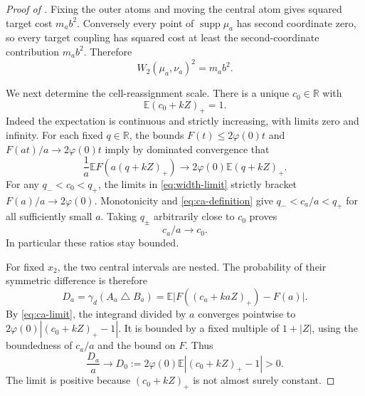 \documentclass[11pt]{article}
\numberwithin{equation}{section}
\theoremstyle{remark}
\newcommand{\R}{\mathbb R}
\newcommand{\E}{\mathbb E}
\newcommand{\supp}{\operatorname{supp}}
\begin{document}
\begin{proof}[Proof of ]
Fixing the outer atoms and moving the central atom gives squared target cost $m_ab^2$. Conversely every point of $\supp\mu_a$ has second coordinate zero, so every target coupling has squared cost at least the second-coordinate contribution $m_ab^2$. Therefore
\begin{equation}\label{eq:gaussian-w2}
 W_2(\mu_a,\nu_a)^2=m_ab^2.
\end{equation}

We next determine the cell-reassignment scale. There is a unique $c_0\in\R$ with
\begin{equation}\label{eq:c0}
 \E(c_0+kZ)_+=1.
\end{equation}
Indeed the expectation is continuous and strictly increasing, with limits zero and infinity. For each fixed $q\in\R$, the bounds
$F(t)\le2\varphi(0)t$ and $F(at)/a\to2\varphi(0)t$ imply by dominated convergence that
\begin{equation}\label{eq:width-limit}
 \frac1a\E F(a(q+kZ)_+)
 \longrightarrow 2\varphi(0)\E(q+kZ)_+.
\end{equation}
For any $q_-<c_0<q_+$, the limits in \eqref{eq:width-limit} strictly bracket $F(a)/a\to2\varphi(0)$. Monotonicity and \eqref{eq:ca-definition} give $q_-<c_a/a<q_+$ for all sufficiently small $a$. Taking $q_\pm$ arbitrarily close to $c_0$ proves
\begin{equation}\label{eq:ca-limit}
 c_a/a\longrightarrow c_0.
\end{equation}
In particular these ratios stay bounded.

For fixed $x_2$, the two central intervals are nested. The probability of their symmetric difference is therefore
\[
 D_a=\gamma_d(A_a\mathbin\triangle B_a)
 =\E\bigl|F((c_a+kaZ)_+)-F(a)\bigr|.
\]
By \eqref{eq:ca-limit}, the integrand divided by $a$ converges pointwise to $2\varphi(0)|(c_0+kZ)_+-1|$. It is bounded by a fixed multiple of $1+|Z|$, using the boundedness of $c_a/a$ and the bound on $F$. Thus
\begin{equation}\label{eq:Da-limit}
 \frac{D_a}{a}\longrightarrow
 D_0:=2\varphi(0)\E|(c_0+kZ)_+-1|>0.
\end{equation}
The limit is positive because $(c_0+kZ)_+$ is not almost surely constant.


\end{proof}
\end{document}

